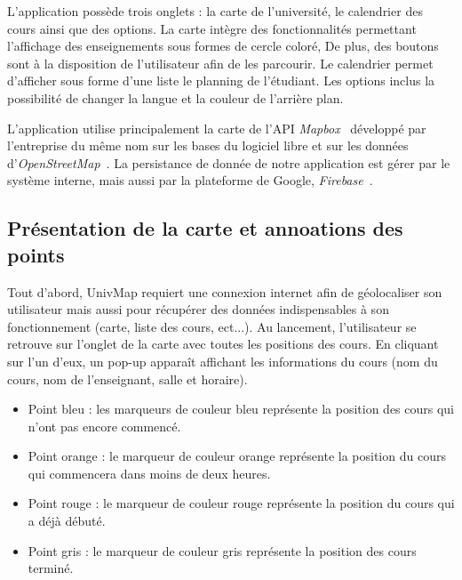 \documentclass{article}
\begin{document}
L'application possède trois onglets : la carte de l'université, le calendrier des cours ainsi que des options.
La carte intègre des fonctionnalités permettant l'affichage des enseignements sous formes de cercle coloré, De plus,
des boutons sont à la disposition de l'utilisateur afin de les parcourir.
Le calendrier permet d'afficher sous forme d'une liste le planning de l'étudiant.
Les options inclus la possibilité de changer la langue et la couleur de l'arrière plan.

L'application utilise principalement la carte de l'API \textit{Mapbox}~\cite{mapboxDoc} développé par l'entreprise
du même nom sur les bases du logiciel libre et sur les données d'\textit{OpenStreetMap}~\cite{openstreetmapDoc}.
La persistance de donnée de notre application est gérer par le système interne, mais aussi par la plateforme
de Google, \textit{Firebase}~\cite{firebaseDoc}.



\newpage %



\subsection{Présentation de la carte et annoations des points}

Tout d'abord, UnivMap requiert une connexion internet afin de géolocaliser son utilisateur mais aussi
pour récupérer des données indispensables à son fonctionnement (carte, liste des cours, ect...). Au lancement,
l'utilisateur se retrouve sur l'onglet de la carte avec toutes les positions des cours. En cliquant sur l'un d'eux,
un pop-up apparaît affichant les informations du cours (nom du cours, nom de l'enseignant, salle et horaire).\\

\begin{itemize}
    \item Point bleu : les marqueurs de couleur bleu représente la position des cours qui n'ont pas encore commencé.

    \item Point orange : le marqueur de couleur orange représente la position du cours qui commencera dans
    moins de deux heures.

    \item Point rouge : le marqueur de couleur rouge représente la position du cours qui a déjà débuté.

    \item Point gris : le marqueur de couleur gris représente la position des cours terminé.
\end{itemize}
\end{document}
